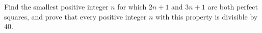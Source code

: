 Find the smallest positive integer $n$ for which $2n+1$ and $3n+1$ are both perfect squares, and prove that every positive integer $n$ with this property is divisible by $40$.
